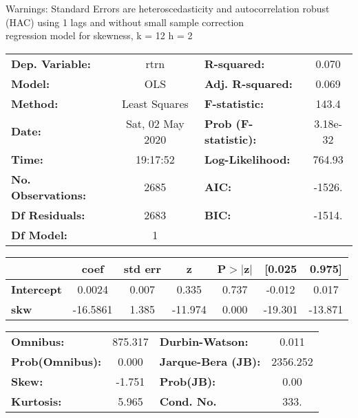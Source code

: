 Warnings: \newline
 [1] Standard Errors are heteroscedasticity and autocorrelation robust (HAC) using 1 lags and without small sample correction\\ 

regression model for skewness, k = 12 h = 2\begin{center}
\begin{tabular}{lclc}
\toprule
\textbf{Dep. Variable:}    &       rtrn       & \textbf{  R-squared:         } &     0.070   \\
\textbf{Model:}            &       OLS        & \textbf{  Adj. R-squared:    } &     0.069   \\
\textbf{Method:}           &  Least Squares   & \textbf{  F-statistic:       } &     143.4   \\
\textbf{Date:}             & Sat, 02 May 2020 & \textbf{  Prob (F-statistic):} &  3.18e-32   \\
\textbf{Time:}             &     19:17:52     & \textbf{  Log-Likelihood:    } &    764.93   \\
\textbf{No. Observations:} &        2685      & \textbf{  AIC:               } &    -1526.   \\
\textbf{Df Residuals:}     &        2683      & \textbf{  BIC:               } &    -1514.   \\
\textbf{Df Model:}         &           1      & \textbf{                     } &             \\
\bottomrule
\end{tabular}
\begin{tabular}{lcccccc}
                   & \textbf{coef} & \textbf{std err} & \textbf{z} & \textbf{P$> |$z$|$} & \textbf{[0.025} & \textbf{0.975]}  \\
\midrule
\textbf{Intercept} &       0.0024  &        0.007     &     0.335  &         0.737        &       -0.012    &        0.017     \\
\textbf{skw}       &     -16.5861  &        1.385     &   -11.974  &         0.000        &      -19.301    &      -13.871     \\
\bottomrule
\end{tabular}
\begin{tabular}{lclc}
\textbf{Omnibus:}       & 875.317 & \textbf{  Durbin-Watson:     } &    0.011  \\
\textbf{Prob(Omnibus):} &   0.000 & \textbf{  Jarque-Bera (JB):  } & 2356.252  \\
\textbf{Skew:}          &  -1.751 & \textbf{  Prob(JB):          } &     0.00  \\
\textbf{Kurtosis:}      &   5.965 & \textbf{  Cond. No.          } &     333.  \\
\bottomrule
\end{tabular}
\end{center}

